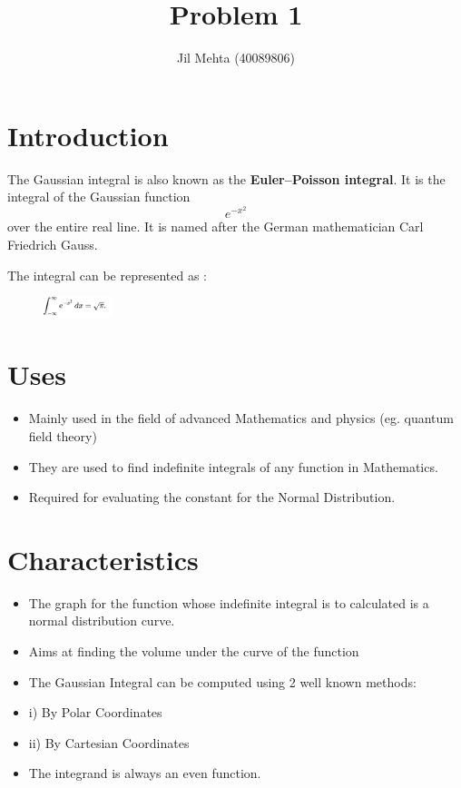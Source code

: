 \documentclass{article}
\title{Problem 1}
\author{Jil Mehta (40089806) }
\begin{document}
\maketitle

\section{Introduction}
The Gaussian integral is  also known as the \textbf{Euler–Poisson integral}. It is the integral of the Gaussian function  \begin{equation} e^{-x^2} \end{equation} over the entire real line. It is named after the German mathematician Carl Friedrich Gauss.
\item
The integral can be represented as : 
\begin{figure}[htp]
    \centering
    \includegraphics [width=2cm]{img}
\end{figure}

\section{Uses}
\begin{itemize}
    \item 
    Mainly used in the field of advanced Mathematics and physics (eg. quantum field theory)
\item
They are used to find indefinite integrals of any function in Mathematics.
\item
Required for evaluating the constant for the Normal Distribution.
\end{itemize}

\section{Characteristics}
\begin{itemize}
\item 
The graph for the function whose indefinite integral is to calculated is a normal distribution curve.
\item
Aims at finding the volume under the curve of the function
\item
The Gaussian Integral can be computed using 2 well known methods:
\item[]i) By Polar Coordinates
\item[]ii) By Cartesian Coordinates
\item
The integrand is always an even function.
\end{itemize}
\end{document}
